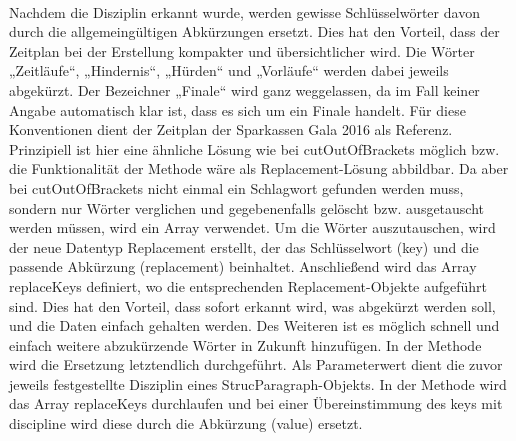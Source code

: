 \\
Nachdem die Disziplin erkannt wurde, werden gewisse Schlüsselwörter davon durch die allgemeingültigen Abkürzungen ersetzt. Dies hat den Vorteil, dass der Zeitplan bei der Erstellung kompakter und übersichtlicher wird. Die Wörter „Zeitläufe“, „Hindernis“, „Hürden“ und „Vorläufe“ werden dabei jeweils abgekürzt. Der Bezeichner „Finale“ wird ganz weggelassen, da im Fall keiner Angabe automatisch klar ist, dass es sich um ein Finale handelt. Für diese Konventionen dient der Zeitplan der Sparkassen Gala 2016 als Referenz. Prinzipiell ist hier eine ähnliche Lösung wie bei cutOutOfBrackets möglich bzw. die Funktionalität der Methode wäre als Replacement-Lösung abbildbar. Da aber bei cutOutOfBrackets nicht einmal ein Schlagwort gefunden werden muss, sondern nur Wörter verglichen und gegebenenfalls gelöscht bzw. ausgetauscht werden müssen, wird ein Array verwendet. Um die Wörter auszutauschen, wird der neue Datentyp Replacement erstellt, der das Schlüsselwort (key) und die passende Abkürzung (replacement) beinhaltet. Anschließend wird das Array replaceKeys definiert, wo die entsprechenden Replacement-Objekte aufgeführt sind. Dies hat den Vorteil, dass sofort erkannt wird, was abgekürzt werden soll, und die Daten einfach gehalten werden. Des Weiteren ist es möglich schnell und einfach weitere abzukürzende Wörter in Zukunft hinzufügen. In der Methode wird die Ersetzung letztendlich durchgeführt. Als Parameterwert dient die zuvor jeweils festgestellte Disziplin eines StrucParagraph-Objekts. In der Methode wird das Array replaceKeys durchlaufen und bei einer Übereinstimmung des keys mit discipline wird diese durch die Abkürzung (value) ersetzt.

